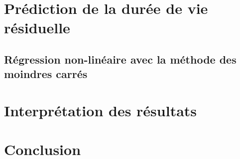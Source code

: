 \documentclass[12pt]{article}
\begin{document}
\section{Prédiction de la durée de vie résiduelle}
\subsection{Régression non-linéaire avec la méthode des moindres carrés}

\section{Interprétation des résultats}

\section{Conclusion}
\end{document}
